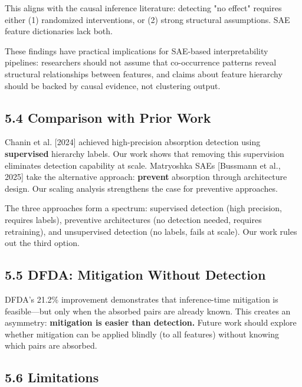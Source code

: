 \documentclass{article}
\begin{document}
This aligns with the causal inference literature: detecting "no effect" requires either (1) randomized interventions, or (2) strong structural assumptions. SAE feature dictionaries lack both.

These findings have practical implications for SAE-based interpretability pipelines: researchers should not assume that co-occurrence patterns reveal structural relationships between features, and claims about feature hierarchy should be backed by causal evidence, not clustering output.

\subsection{5.4 Comparison with Prior Work}

Chanin et al. [2024] achieved high-precision absorption detection using \textbf{supervised} hierarchy labels. Our work shows that removing this supervision eliminates detection capability at scale. Matryoshka SAEs [Bussmann et al., 2025] take the alternative approach: \textbf{prevent} absorption through architecture design. Our scaling analysis strengthens the case for preventive approaches.

The three approaches form a spectrum: supervised detection (high precision, requires labels), preventive architectures (no detection needed, requires retraining), and unsupervised detection (no labels, fails at scale). Our work rules out the third option.

\subsection{5.5 DFDA: Mitigation Without Detection}

DFDA's 21.2\% improvement demonstrates that inference-time mitigation is feasible---but only when the absorbed pairs are already known. This creates an asymmetry: \textbf{mitigation is easier than detection.} Future work should explore whether mitigation can be applied blindly (to all features) without knowing which pairs are absorbed.

\subsection{5.6 Limitations}
\end{document}
